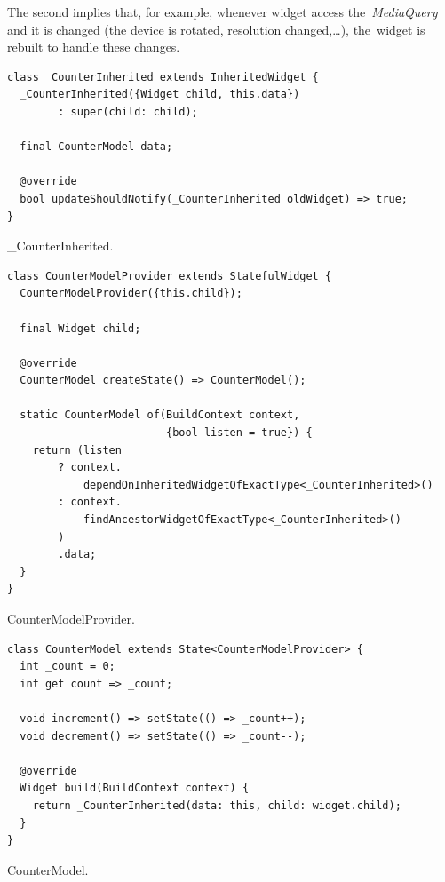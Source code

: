 The second implies that, for example, whenever widget access the~\textit{MediaQuery} and it is changed (the device is rotated, resolution changed,\ldots ), the~widget is rebuilt to handle these changes. 

\begin{listing}[ht]
\begin{verbatim}
class _CounterInherited extends InheritedWidget {
  _CounterInherited({Widget child, this.data}) 
        : super(child: child);

  final CounterModel data;

  @override
  bool updateShouldNotify(_CounterInherited oldWidget) => true;
}
\end{verbatim}
\caption{\_CounterInherited.}
\label{listing:counter-inherited-counter-inherited}
\end{listing}

\begin{listing}[ht]
\begin{verbatim}
class CounterModelProvider extends StatefulWidget {
  CounterModelProvider({this.child});
  
  final Widget child;
  
  @override
  CounterModel createState() => CounterModel();

  static CounterModel of(BuildContext context, 
                         {bool listen = true}) {
    return (listen
        ? context.
            dependOnInheritedWidgetOfExactType<_CounterInherited>()
        : context.
            findAncestorWidgetOfExactType<_CounterInherited>()
        )
        .data;
  }
}
\end{verbatim}
\caption{CounterModelProvider.}
\label{listing:counter-inherited-model-provider}
\end{listing}

\begin{listing}[ht]
\begin{verbatim}
class CounterModel extends State<CounterModelProvider> {
  int _count = 0;
  int get count => _count;

  void increment() => setState(() => _count++);
  void decrement() => setState(() => _count--);

  @override
  Widget build(BuildContext context) {
    return _CounterInherited(data: this, child: widget.child);
  }
}
\end{verbatim}
\caption{CounterModel.}
\label{listing:counter-inherited-counter-model}
\end{listing}

